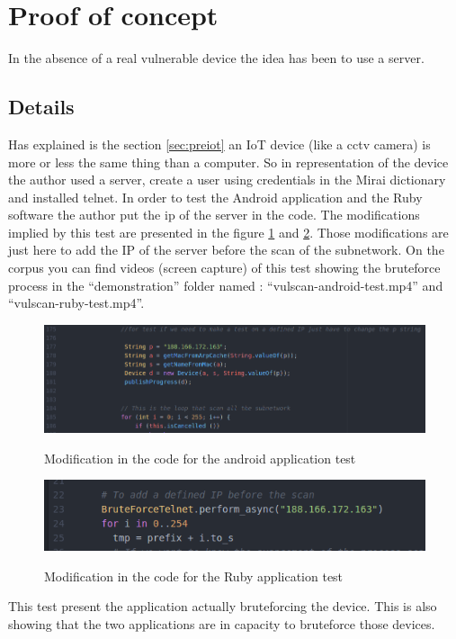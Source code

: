 \documentclass{report}
\begin{document}
\section{Proof of concept}
In the absence of a real vulnerable device the idea has been to use a server.

\subsection{Details}
Has explained is the section \ref{sec:preiot} an IoT device (like a cctv camera) is more or less the same thing than a computer. So in representation of the device the author used a server, create a user using credentials in the Mirai dictionary and installed telnet. In order to test the Android application and the Ruby software the author put the ip of the server in the code. The modifications implied by this test are presented in the figure \ref{fig:mod-and} and \ref{fig:mod-ruby}. Those modifications are just here to add the IP of the server before the scan of the subnetwork. On the corpus you can find videos (screen capture) of this test showing the bruteforce process in the ``demonstration'' folder named : ``vulscan-android-test.mp4'' and ``vulscan-ruby-test.mp4''.
\begin{figure}[h]
 \caption{Modification in the code for the android application test}
 \centering
 \includegraphics[width=1.2\textwidth]{./img/exp/vulscan-android-test-modification}
 \label{fig:mod-and}
\end{figure}
\begin{figure}[h]
 \caption{Modification in the code for the Ruby application test}
 \centering
 \includegraphics[width=1.2\textwidth]{./img/exp/vulscan-ruby-test-modification}
 \label{fig:mod-ruby}
\end{figure}
This test present the application actually bruteforcing the device. This is also showing that the two applications are in capacity to bruteforce those devices.
\end{document}
